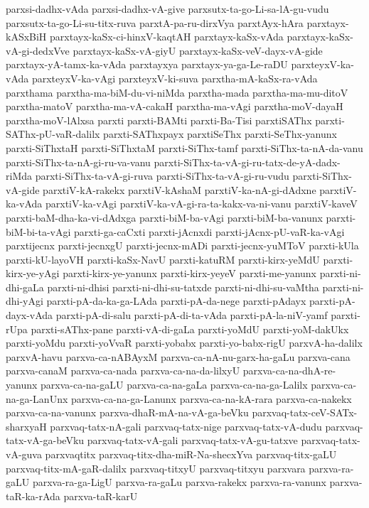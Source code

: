 {parxsi-dadhx-vAda
parxsi-dadhx-vA-give
parxsutx-ta-go-Li-sa-lA-gu-vudu
parxsutx-ta-go-Li-su-titx-ruva
parxtA-pa-ru-dirxVya
parxtAyx-hAra
parxtayx-kASxBiH
parxtayx-kaSx-ci-hinxV-kaqtAH
parxtayx-kaSx-vAda
parxtayx-kaSx-vA-gi-dedxVve
parxtayx-kaSx-vA-giyU
parxtayx-kaSx-veV-dayx-vA-gide
parxtayx-yA-tamx-ka-vAda
parxtayxya
parxtayx-ya-ga-Le-raDU
parxteyxV-ka-vAda
parxteyxV-ka-vAgi
parxteyxV-ki-suva
parxtha-mA-kaSx-ra-vAda
parxthama
parxtha-ma-biM-du-vi-niMda
parxtha-mada
parxtha-ma-mu-ditoV
parxtha-matoV
parxtha-ma-vA-cakaH
parxtha-ma-vAgi
parxtha-moV-dayaH
parxtha-moV-lAlxsa
parxti
parxti-BAMti
parxti-Ba-Tisi
parxtiSAThx
parxti-SAThx-pU-vaR-dalilx
parxti-SAThxpayx
parxtiSeThx
parxti-SeThx-yanunx
parxti-SiThxtaH
parxti-SiThxtaM
parxti-SiThx-tamf
parxti-SiThx-ta-nA-da-vanu
parxti-SiThx-ta-nA-gi-ru-va-vanu
parxti-SiThx-ta-vA-gi-ru-tatx-de-yA-dadx-riMda
parxti-SiThx-ta-vA-gi-ruva
parxti-SiThx-ta-vA-gi-ru-vudu
parxti-SiThx-vA-gide
parxtiV-kA-rakekx
parxtiV-kAshaM
parxtiV-ka-nA-gi-dAdxne
parxtiV-ka-vAda
parxtiV-ka-vAgi
parxtiV-ka-vA-gi-ra-ta-kakx-va-ni-vanu
parxtiV-kaveV
parxti-baM-dha-ka-vi-dAdxga
parxti-biM-ba-vAgi
parxti-biM-ba-vanunx
parxti-biM-bi-ta-vAgi
parxti-ga-caCxti
parxti-jAcnxdi
parxti-jAcnx-pU-vaR-ka-vAgi
parxtijecnx
parxti-jecnxgU
parxti-jecnx-mADi
parxti-jecnx-yuMToV
parxti-kUla
parxti-kU-layoVH
parxti-kaSx-NavU
parxti-katuRM
parxti-kirx-yeMdU
parxti-kirx-ye-yAgi
parxti-kirx-ye-yanunx
parxti-kirx-yeyeV
parxti-me-yanunx
parxti-ni-dhi-gaLa
parxti-ni-dhisi
parxti-ni-dhi-su-tatxde
parxti-ni-dhi-su-vaMtha
parxti-ni-dhi-yAgi
parxti-pA-da-ka-ga-LAda
parxti-pA-da-nege
parxti-pAdayx
parxti-pA-dayx-vAda
parxti-pA-di-salu
parxti-pA-di-ta-vAda
parxti-pA-la-niV-yamf
parxti-rUpa
parxti-sAThx-pane
parxti-vA-di-gaLa
parxti-yoMdU
parxti-yoM-dakUkx
parxti-yoMdu
parxti-yoVvaR
parxti-yobabx
parxti-yo-babx-rigU
parxvA-ha-dalilx
parxvA-havu
parxva-ca-nABAyxM
parxva-ca-nA-nu-garx-ha-gaLu
parxva-cana
parxva-canaM
parxva-ca-nada
parxva-ca-na-da-lilxyU
parxva-ca-na-dhA-re-yanunx
parxva-ca-na-gaLU
parxva-ca-na-gaLa
parxva-ca-na-ga-Lalilx
parxva-ca-na-ga-LanUnx
parxva-ca-na-ga-Lanunx
parxva-ca-na-kA-rara
parxva-ca-nakekx
parxva-ca-na-vanunx
parxva-dhaR-mA-na-vA-ga-beVku
parxvaq-tatx-ceV-SATx-sharxyaH
parxvaq-tatx-nA-gali
parxvaq-tatx-nige
parxvaq-tatx-vA-dudu
parxvaq-tatx-vA-ga-beVku
parxvaq-tatx-vA-gali
parxvaq-tatx-vA-gu-tatxve
parxvaq-tatx-vA-guva
parxvaqtitx
parxvaq-titx-dha-miR-Na-shecxYva
parxvaq-titx-gaLU
parxvaq-titx-mA-gaR-dalilx
parxvaq-titxyU
parxvaq-titxyu
parxvara
parxva-ra-gaLU
parxva-ra-ga-LigU
parxva-ra-gaLu
parxva-rakekx
parxva-ra-vanunx
parxva-taR-ka-rAda
parxva-taR-karU
}
